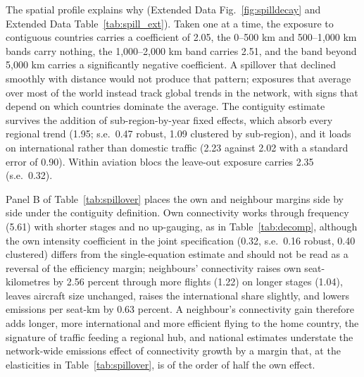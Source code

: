 \documentclass[12pt]{article}
\begin{document}
The spatial profile explains why (Extended Data Fig.~\ref{fig:spilldecay}
and Extended Data Table~\ref{tab:spill_ext}). Taken one at a time, the
exposure to contiguous countries carries a coefficient of 2.05, the 0--500
km and 500--1{,}000 km bands carry nothing, the 1{,}000--2{,}000 km band
carries 2.51, and the band beyond 5{,}000 km carries a significantly
negative coefficient. A spillover that declined smoothly with distance
would not produce that pattern; exposures that average over most of the
world instead track global trends in the network, with signs that depend
on which countries dominate the average. The contiguity estimate survives
the addition of sub-region-by-year fixed effects, which absorb every
regional trend (1.95; s.e.\ 0.47 robust, 1.09 clustered by sub-region),
and it loads on international rather than domestic traffic (2.23 against
2.02 with a standard error of 0.90). Within aviation blocs the leave-out
exposure carries 2.35 (s.e.\ 0.32).

Panel B of Table~\ref{tab:spillover} places the own and neighbour margins
side by side under the contiguity definition. Own connectivity works
through frequency (5.61) with shorter stages and no up-gauging, as in
Table~\ref{tab:decomp}, although the own intensity coefficient in the
joint specification (0.32, s.e.\ 0.16 robust, 0.40 clustered) differs from
the single-equation estimate and should not be read as a reversal of the
efficiency margin; neighbours' connectivity raises own seat-kilometres by 2.56 percent
through more flights (1.22) on longer stages (1.04), leaves aircraft size
unchanged, raises the international share slightly, and lowers emissions
per seat-km by 0.63 percent. A neighbour's connectivity gain therefore
adds longer, more international and more efficient flying to the home
country, the signature of traffic feeding a regional hub, and national
estimates understate the network-wide emissions effect of connectivity
growth by a margin that, at the elasticities in Table~\ref{tab:spillover},
is of the order of half the own effect.
\end{document}
